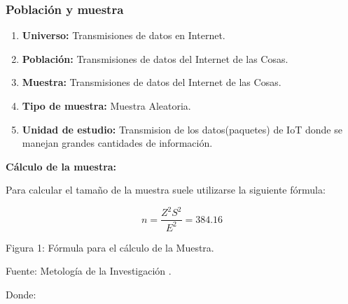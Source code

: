             \subsubsection{Población y muestra}    
                \vskip 0.3cm
                \begin{enumerate}
                    \item[]{{\bf Universo:} Transmisiones de datos en Internet.}
                    \item[]{{\bf Población:} Transmisiones de datos del Internet de las Cosas.}
                    \item[]{{\bf Muestra:} Transmisiones de datos del Internet de las Cosas.}
                    \item[]{{\bf Tipo de muestra:} Muestra Aleatoria.}
                    \item[]{{\bf Unidad de estudio:} Transmision de los datos(paquetes) de IoT donde se manejan grandes cantidades de información.}
                \end{enumerate}\par                 
                \vskip 0.3cm

                {\bf Cálculo de la muestra:}\par
                \vskip 0.3cm

                Para calcular el tamaño de la muestra suele utilizarse la siguiente fórmula:\par
                \begin{equation*}\label{}
                    n = \frac{Z^{2}S^{2}}{E^{2}} = 384.16
                \end{equation*}
                \begin{center}
                    { Figura 1: Fórmula para el cálculo de la Muestra.}\par
                    { Fuente: Metología de la Investigación {\cite{sampieri1997}}. }\par
                \end{center} 
                \vskip 0.3cm   

                Donde:
                \vskip 0.3cm

